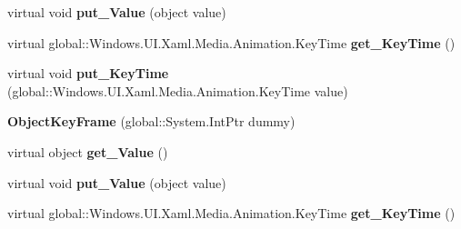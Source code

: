\begin{DoxyCompactItemize}
virtual void {\bfseries put\+\_\+\+Value} (object value)
\item 
\mbox{\label{class_windows_1_1_u_i_1_1_xaml_1_1_media_1_1_animation_1_1_object_key_frame_a6ae8fd2feca5365340534cb345435679}} 
virtual global\+::\+Windows.\+U\+I.\+Xaml.\+Media.\+Animation.\+Key\+Time {\bfseries get\+\_\+\+Key\+Time} ()
\item 
\mbox{\label{class_windows_1_1_u_i_1_1_xaml_1_1_media_1_1_animation_1_1_object_key_frame_a3d3dee8a9ef100ac928ef177d7c8ec55}} 
virtual void {\bfseries put\+\_\+\+Key\+Time} (global\+::\+Windows.\+U\+I.\+Xaml.\+Media.\+Animation.\+Key\+Time value)
\item 
\mbox{\label{class_windows_1_1_u_i_1_1_xaml_1_1_media_1_1_animation_1_1_object_key_frame_ac48b6f8a34c2efefb0da6485e4eea19e}} 
{\bfseries Object\+Key\+Frame} (global\+::\+System.\+Int\+Ptr dummy)
\item 
\mbox{\label{class_windows_1_1_u_i_1_1_xaml_1_1_media_1_1_animation_1_1_object_key_frame_ad164bdb41cb8c8711d86923fe1b8e67c}} 
virtual object {\bfseries get\+\_\+\+Value} ()
\item 
\mbox{\label{class_windows_1_1_u_i_1_1_xaml_1_1_media_1_1_animation_1_1_object_key_frame_a7a88c4df7997178c63cfd7b1d90e0db7}} 
virtual void {\bfseries put\+\_\+\+Value} (object value)
\item 
\mbox{\label{class_windows_1_1_u_i_1_1_xaml_1_1_media_1_1_animation_1_1_object_key_frame_a6ae8fd2feca5365340534cb345435679}} 
virtual global\+::\+Windows.\+U\+I.\+Xaml.\+Media.\+Animation.\+Key\+Time {\bfseries get\+\_\+\+Key\+Time} ()
\item 
\mbox{\label{class_windows_1_1_u_i_1_1_xaml_1_1_media_1_1_animation_1_1_object_key_frame_a3d3dee8a9ef100ac928ef177d7c8ec55}} 

\end{DoxyCompactItemize}
